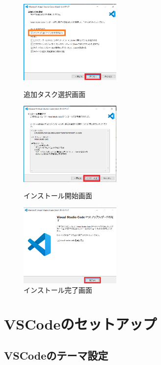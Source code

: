 \documentclass[dvipdfmx]{jsarticle}
\begin{document}
\begin{figure}[H]
    \begin{minipage}[b]{0.33\linewidth}
        \centering
        \includegraphics[width=5cm]{images/VSCodeInstaller4.png}
        \caption{追加タスク選択画面}
    \end{minipage}
    \begin{minipage}[b]{0.33\linewidth}
        \centering
        \includegraphics[width=5cm]{images/VSCodeInstaller5.png}
        \caption{インストール開始画面}
    \end{minipage}
    \begin{minipage}[b]{0.33\linewidth}
        \centering
        \includegraphics[width=5cm]{images/VSCodeInstaller6.png}
        \caption{インストール完了画面}
    \end{minipage}
\end{figure}

\section{VSCodeのセットアップ}

\subsection{VSCodeのテーマ設定}
\end{document}
